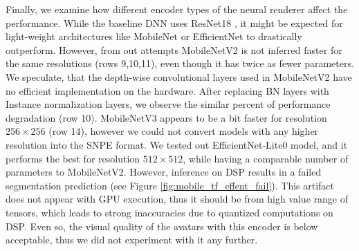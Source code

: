 Finally, we examine how different encoder types of the neural renderer affect the performance. While the baseline DNN uses ResNet18 \cite{dnn:resnet16}, it might be expected for light-weight architectures like MobileNet \cite{dnn:mnv2-18,dnn:mnv3-19} or EfficientNet \cite{dnn:efficientnetv1-19} to drastically outperform. However, from out attempts MobileNetV2 is not inferred faster for the same resolutions (rows 9,10,11), even though it has twice as fewer parameters. We speculate, that the depth-wise convolutional layers used in MobileNetV2 have no efficient implementation on the hardware. After replacing BN layers with Instance normalization layers, we observe the similar percent of performance degradation (row 10). MobileNetV3 \cite{dnn:mnv3-19} appears to be a bit faster for resolution $256 \times 256$ (row 14), however we could not convert models with any higher resolution into the SNPE format. We tested out EfficientNet-Lite0  model, and it performs the best for resolution $512 \times 512$, while having a comparable number of parameters to MobileNetV2. However, inference on DSP results in a failed segmentation prediction (see Figure \ref{fig:mobile_tf_effent_fail}). This artifact does not appear with GPU execution, thus it should be from high value range of tensors, which leads to strong inaccuracies due to quantized computations on DSP. Even so, the visual quality of the avatars with this encoder is below acceptable, thus we did not experiment with it any further.
 
